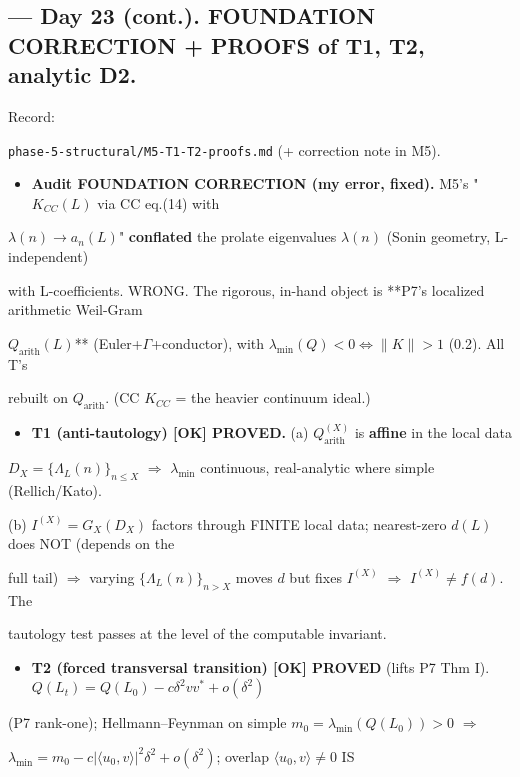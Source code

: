 \documentclass[10pt]{article}
\begin{document}
\subsection*{ --- Day 23 (cont.). FOUNDATION CORRECTION + PROOFS of T1, T2, analytic D2.}
Record:\par
\texttt{phase-5-structural/M5-T1-T2-proofs.md} (+ correction note in M5).\par
\begin{itemize}
\item \textbf{Audit FOUNDATION CORRECTION (my error, fixed).} M5's "$K_{CC}(L)$ via CC eq.(14) with
\end{itemize}
  $\lambda(n)\to a_n(L)$" \textbf{conflated} the prolate eigenvalues $\lambda(n)$ (Sonin geometry, L-independent)\par
  with L-coefficients. WRONG. The rigorous, in-hand object is **P7's localized arithmetic Weil-Gram\par
  $Q_{\mathrm{arith}}(L)$** (Euler+$\Gamma$+conductor), with $\lambda_{\min}(Q)<0\iff\|K\|>1$ (0.2). All T's\par
  rebuilt on $Q_{\mathrm{arith}}$. (CC $K_{CC}$ = the heavier continuum ideal.)\par
\begin{itemize}
\item \textbf{T1 (anti-tautology) [OK] PROVED.} (a) $Q_{\mathrm{arith}}^{(X)}$ is \textbf{affine} in the local data
\end{itemize}
  $D_X=\{\Lambda_L(n)\}_{n\le X}$ \ensuremath{\Rightarrow} $\lambda_{\min}$ continuous, real-analytic where simple (Rellich/Kato).\par
  (b) $I^{(X)}=G_X(D_X)$ factors through FINITE local data; nearest-zero $d(L)$ does NOT (depends on the\par
  full tail) \ensuremath{\Rightarrow} varying $\{\Lambda_L(n)\}_{n>X}$ moves $d$ but fixes $I^{(X)}$ \ensuremath{\Rightarrow} $I^{(X)}\ne f(d)$. The\par
  tautology test passes at the level of the computable invariant.\par
\begin{itemize}
\item \textbf{T2 (forced transversal transition) [OK] PROVED} (lifts P7 Thm I). $Q(L_t)=Q(L_0)-c\delta^2 vv^*+o(\delta^2)$
\end{itemize}
  (P7 rank-one); Hellmann--Feynman on simple $m_0=\lambda_{\min}(Q(L_0))>0$ \ensuremath{\Rightarrow}\par
  $\lambda_{\min}=m_0-c|\langle u_0,v\rangle|^2\delta^2+o(\delta^2)$; overlap $\langle u_0,v\rangle\ne0$ IS\par
\end{document}
